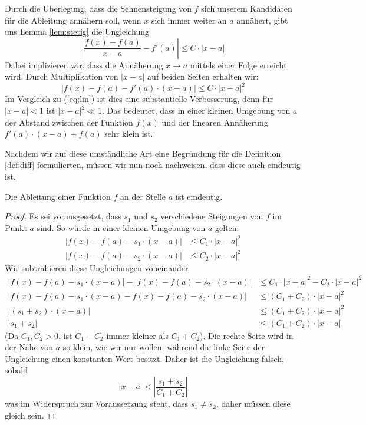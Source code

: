 \bigskip

Durch die Überlegung, dass die Sehnensteigung von $f$ sich unserem Kandidaten für die Ableitung annähern soll, wenn $x$ sich immer weiter an $a$ annähert, gibt uns Lemma \ref{lem:stetig} die Ungleichung
\[
\left| \frac{f(x)-f(a)}{x-a} - f'(a) \right| \le C \cdot |x-a|
\]
Dabei implizieren wir, dass die Annäherung $x\rightarrow a$ mittels einer Folge erreicht wird. Durch Multiplikation von $|x-a|$ auf beiden Seiten erhalten wir:
\[
|f(x)-f(a) -f'(a)\cdot (x-a)| \le C\cdot |x-a|^2
\]
Im Vergleich zu (\ref{eq:lin}) ist dies eine substantielle Verbesserung, denn für $|x-a|<1$ ist $|x-a|^2\ll 1$. Das bedeutet, dass in einer kleinen Umgebung von $a$ der Abstand zwischen der Funktion $f(x)$ und der linearen Annäherung $f'(a)\cdot (x-a)+f(a)$ sehr klein ist.

Nachdem wir auf diese umständliche Art eine Begründung für die Definition \ref{def:diff} formulierten, müssen wir nun noch nachweisen, dass diese auch eindeutig ist. 

\begin{lemma}
Die Ableitung einer Funktion $f$ an der Stelle $a$ ist eindeutig. 
\end{lemma}
\begin{proof}
Es sei vorausgesetzt, dass $s_1$ und $s_2$ verschiedene Steigungen von $f$ im Punkt $a$ sind. So würde in einer kleinen Umgebung von $a$ gelten:
\begin{equation*}
\begin{split}
|f(x)-f(a) -s_1\cdot (x-a)| &\le C_1\cdot |x-a|^2 \\
|f(x)-f(a) -s_2\cdot (x-a)| &\le C_2\cdot |x-a|^2
\end{split}
\end{equation*}
Wir subtrahieren diese Ungleichungen voneinander
\begin{equation}
\begin{split}
|f(x)-f(a) -s_1\cdot (x-a)|-|f(x)-f(a) -s_2\cdot (x-a)| &\le C_1\cdot |x-a|^2-C_2\cdot |x-a|^2 \\
|f(x)-f(a) -s_1\cdot (x-a)-f(x)-f(a) -s_2\cdot (x-a)| &\le (C_1+C_2)\cdot |x-a|^2 \\
|(s_1+s_2)\cdot (x-a)| &\le (C_1+C_2)\cdot |x-a|^2 \\
|s_1+s_2| &\le (C_1+C_2)\cdot |x-a|
\end{split}
\end{equation}
(Da $C_1,C_2 >0$, ist $C_1-C_2$ immer kleiner als $C_1+C_2$). Die rechte Seite wird in der Nähe von $a$ so klein, wie wir nur wollen, während die linke Seite der Ungleichung einen konstanten Wert besitzt. Daher ist die Ungleichung falsch, sobald 
\[
|x-a| < \left| \frac{s_1+s_2}{C_1+C_2} \right|
\]
was im Widerspruch zur Voraussetzung steht, dass $s_1\ne s_2$, daher müssen diese gleich sein.
\end{proof}

